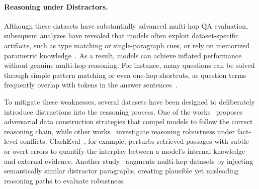 \documentclass[10pt, a4paper]{article}
\begin{document}
\paragraph{Reasoning under Distractors.} Although these datasets have substantially advanced multi-hop QA evaluation, subsequent analyzes have revealed that models often exploit dataset-specific artifacts, such as type matching or single-paragraph cues, or rely on memorized parametric knowledge~\cite{bhuiya2024seemingly, li2024meqa, schnitzler2024morehopqa}. As a result, models can achieve inflated performance without genuine multi-hop reasoning. For instance, many questions can be solved through simple pattern matching or even one-hop shortcuts, as question terms frequently overlap with tokens in the answer sentences~\cite{schlegel-etal-2020-framework, bhuiya2024seemingly}. 

To mitigate these weaknesses, several datasets have been designed to deliberately introduce distractions into the reasoning process. One of the works~\cite{jiang-bansal-2019-avoiding} proposes adversarial data construction strategies that compel models to follow the correct reasoning chain, while other works~\cite{ding2021reasoning} investigate reasoning robustness under fact-level conflicts. ClashEval~\cite{wu2024clasheval}, for example, perturbs retrieved passages with subtle or overt errors to quantify the interplay between a model's internal knowledge and external evidence. Another study~\cite{bhuiya2024seemingly} augments multi-hop datasets by injecting semantically similar distractor paragraphs, creating plausible yet misleading reasoning paths to evaluate robustness.
\end{document}
